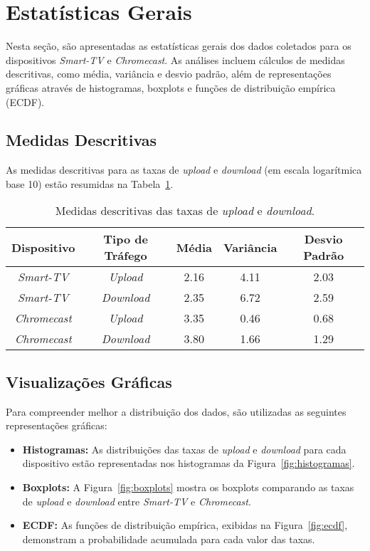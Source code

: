 \section{Estatísticas Gerais}

Nesta seção, são apresentadas as estatísticas gerais dos dados coletados para os dispositivos \textit{Smart-TV} e \textit{Chromecast}. As análises incluem cálculos de medidas descritivas, como média, variância e desvio padrão, além de representações gráficas através de histogramas, boxplots e funções de distribuição empírica (ECDF). 

\subsection{Medidas Descritivas}

As medidas descritivas para as taxas de \textit{upload} e \textit{download} (em escala logarítmica base 10) estão resumidas na Tabela~\ref{tab:estatisticas}. 

\begin{table}[H]
\centering
\caption{Medidas descritivas das taxas de \textit{upload} e \textit{download}.}
\label{tab:estatisticas}
\begin{tabular}{|c|c|c|c|c|}
\hline
\textbf{Dispositivo} & \textbf{Tipo de Tráfego} & \textbf{Média} & \textbf{Variância} & \textbf{Desvio Padrão} \\ \hline
\textit{Smart-TV} & \textit{Upload} & 2.16 & 4.11 & 2.03 \\ \hline
\textit{Smart-TV} & \textit{Download} & 2.35 & 6.72 & 2.59 \\ \hline
\textit{Chromecast} & \textit{Upload} & 3.35 & 0.46 & 0.68 \\ \hline
\textit{Chromecast} & \textit{Download} & 3.80 & 1.66 & 1.29 \\ \hline
\end{tabular}
\end{table}

\subsection{Visualizações Gráficas}

Para compreender melhor a distribuição dos dados, são utilizadas as seguintes representações gráficas:

\begin{itemize}
    \item \textbf{Histogramas:} As distribuições das taxas de \textit{upload} e \textit{download} para cada dispositivo estão representadas nos histogramas da Figura~\ref{fig:histogramas}.
    \item \textbf{Boxplots:} A Figura~\ref{fig:boxplots} mostra os boxplots comparando as taxas de \textit{upload} e \textit{download} entre \textit{Smart-TV} e \textit{Chromecast}.
    \item \textbf{ECDF:} As funções de distribuição empírica, exibidas na Figura~\ref{fig:ecdf}, demonstram a probabilidade acumulada para cada valor das taxas.
\end{itemize}

